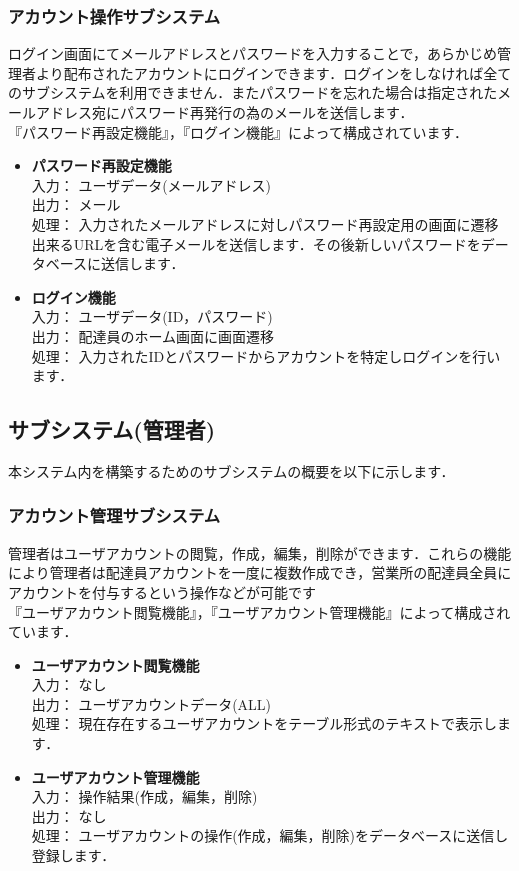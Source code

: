 \documentclass[a4j,titlepage]{jarticle}
\begin{document}
\subsubsection{アカウント操作サブシステム}
ログイン画面にてメールアドレスとパスワードを入力することで，あらかじめ管理者より配布されたアカウントにログインできます．ログインをしなければ全てのサブシステムを利用できません．またパスワードを忘れた場合は指定されたメールアドレス宛にパスワード再発行の為のメールを送信します． \\
『パスワード再設定機能』，『ログイン機能』によって構成されています．
\begin{itemize}
\item \textbf{パスワード再設定機能} \\
入力： ユーザデータ(メールアドレス) \\
出力： メール\\
処理： 入力されたメールアドレスに対しパスワード再設定用の画面に遷移出来るURLを含む電子メールを送信します．その後新しいパスワードをデータベースに送信します．
\item \textbf{ログイン機能} \\
入力： ユーザデータ(ID，パスワード) \\
出力： 配達員のホーム画面に画面遷移 \\
処理： 入力されたIDとパスワードからアカウントを特定しログインを行います．
\end{itemize}


\subsection{サブシステム(管理者)}
本システム内を構築するためのサブシステムの概要を以下に示します．

\subsubsection{アカウント管理サブシステム}
管理者はユーザアカウントの閲覧，作成，編集，削除ができます．これらの機能により管理者は配達員アカウントを一度に複数作成でき，営業所の配達員全員にアカウントを付与するという操作などが可能です\\
『ユーザアカウント閲覧機能』，『ユーザアカウント管理機能』によって構成されています．
\begin{itemize}
\item \textbf{ユーザアカウント閲覧機能} \\
入力： なし \\
出力： ユーザアカウントデータ(ALL) \\
処理： 現在存在するユーザアカウントをテーブル形式のテキストで表示します．
\item \textbf{ユーザアカウント管理機能} \\
入力： 操作結果(作成，編集，削除) \\
出力： なし \\
処理： ユーザアカウントの操作(作成，編集，削除)をデータベースに送信し登録します．
\end{itemize}
\end{document}
